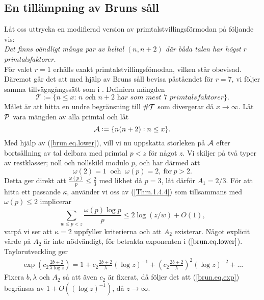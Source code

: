 \subsection{En tillämpning av Bruns såll}
Låt oss uttrycka en modifierad version av primtalstvillingsförmodan på följande vis:\\
\textit{Det finns oändligt många par av heltal $(n,n+2)$ där båda talen har högst $r$ primtalsfaktorer.}\\
För valet $r=1$ erhålls exakt primtalstvillingsfömodan, vilken står obevisad.
Däremot går det att med hjälp av Bruns såll bevisa påståendet för $r=7$, vi följer samma tillvägagångssätt som i \cite[Kap. 6.2]{cojocarumurty}.
Definiera mängden
\begin{equation*}
    \mathcal{T} := \{\textit{$n\leq x$: $n$ och $n+2$ har som mest $7$ primtalsfaktorer}\}.
\end{equation*}
Målet är att hitta en undre begränsning till $\card{\mathcal{T}}$ som divergerar då $x\to\infty$.
Låt $\P$ vara mängden av alla primtal och låt
\begin{equation*}
    \A := \{n(n+2): n\leq x\}.
\end{equation*}
Med hjälp av (\ref{brun.eq.lower}), vill vi nu uppskatta storleken på $\A$ efter bortsållning av tal delbara med primtal $p<z$ för något $z$.
Vi skiljer på två typer av restklasser; noll och nollskild modulo $p$, och har därmed att
\begin{equation*}
    \omega(2)=1\ \text{ och }\ \omega(p)=2,\ \text{för}\ p>2.
\end{equation*}
Detta ger direkt att $\frac{\omega(p)}{p}\leq\frac{2}{3}$ med likhet då $p=3$, låt därför $A_1=2/3$.
För att hitta ett passande $\kappa$, använder vi oss av (\ref{Thm.1.4.4}) som tillsammans med $\omega(p)\leq2$ implicerar
\begin{equation*}
    \sum_{w\leq p<z} \frac{\omega(p)\log p}{p} \leq 2\log\left(z/w\right) + O(1),
\end{equation*}
varpå vi ser att $\kappa=2$ uppfyller kriterierna och att $A_2$ existerar.
Något explicit värde på $A_2$ är inte nödvändigt, för betrakta exponenten i ($\ref{brun.eq.lower}$). Taylorutveckling ger
\begin{align}\label{brun.eq.exp}
    \exp\left(c_2\frac{2b+2}{\lambda\log z}\right) = 1 + c_2\frac{2b+2}{\lambda}(\log z)^{-1} + \left(c_2\frac{2b+2}{\lambda}\right)^2(\log z)^{-2} + ...
\end{align}
Fixera $b,\lambda$ och $A_2$ så att även $c_2$ är fixerat, då följer det att (\ref{brun.eq.exp}) begränsas av $1+O((\log z)^{-1})$, då $z\to\infty$.
